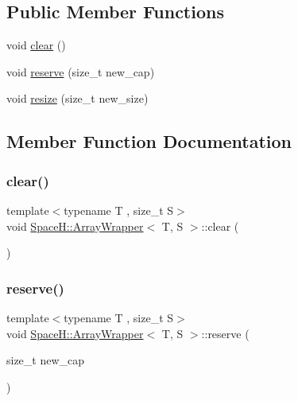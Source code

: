 \subsection*{Public Member Functions}
\begin{DoxyCompactItemize}
\item 
void \mbox{\hyperlink{struct_space_h_1_1_array_wrapper_ac388a0420df96cf7fa128af10bd91514}{clear}} ()
\item 
void \mbox{\hyperlink{struct_space_h_1_1_array_wrapper_a0b6c9b3a863b31b77f67a61afdd3f6f1}{reserve}} (size\+\_\+t new\+\_\+cap)
\item 
void \mbox{\hyperlink{struct_space_h_1_1_array_wrapper_a5198ec13cd7200e87bd786bcc1692884}{resize}} (size\+\_\+t new\+\_\+size)
\end{DoxyCompactItemize}


\subsection{Member Function Documentation}
\mbox{\label{struct_space_h_1_1_array_wrapper_ac388a0420df96cf7fa128af10bd91514}} 
\subsubsection{\texorpdfstring{clear()}{clear()}}
{\footnotesize\ttfamily template$<$typename T , size\+\_\+t S$>$ \\
void \mbox{\hyperlink{struct_space_h_1_1_array_wrapper}{Space\+H\+::\+Array\+Wrapper}}$<$ T, S $>$\+::clear (\begin{DoxyParamCaption}{ }\end{DoxyParamCaption})\hspace{0.3cm}{\ttfamily [inline]}}

\mbox{\label{struct_space_h_1_1_array_wrapper_a0b6c9b3a863b31b77f67a61afdd3f6f1}} 
\subsubsection{\texorpdfstring{reserve()}{reserve()}}
{\footnotesize\ttfamily template$<$typename T , size\+\_\+t S$>$ \\
void \mbox{\hyperlink{struct_space_h_1_1_array_wrapper}{Space\+H\+::\+Array\+Wrapper}}$<$ T, S $>$\+::reserve (\begin{DoxyParamCaption}\item[{size\+\_\+t}]{new\+\_\+cap }\end{DoxyParamCaption})\hspace{0.3cm}{\ttfamily [inline]}}

